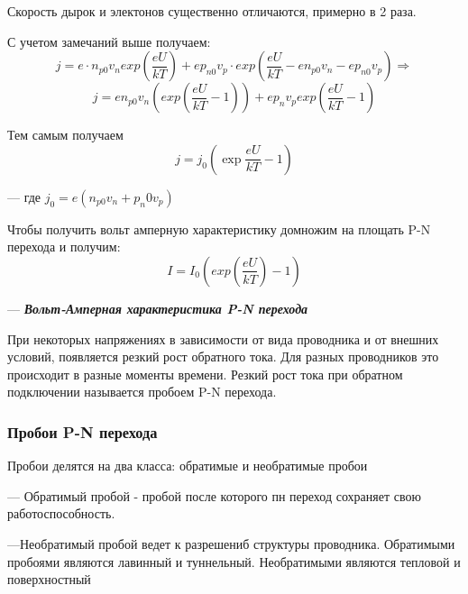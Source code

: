 \documentclass[../main.tex]{subfiles}
\begin{document}
Скорость дырок и электонов существенно отличаются, примерно в 2 раза.

С учетом замечаний выше получаем:
\[j = e \cdot n_{p0} v_n exp(\frac{eU}{kT}) + ep_{n0} v_p \cdot exp(\frac{eU}{kT} - en_{p0} v_n - ep_{n0} v_p)  \Rightarrow \]
\[ j = e n_{p0} v_n(exp(\frac{eU}{kT} - 1)) + e p_n v_p exp(\frac{eU}{kT} - 1)\]

Тем самым получаем
\[ j = j_0(\exp{\frac{eU}{kT}} - 1)\]
\begin{center}
 --- где $j_0 = e (n_{p0} v_n + p_n0 v_p)$
\end{center}
Чтобы получить вольт амперную характеристику домножим на площать P-N перехода и получим:
\[I = I_0(exp(\frac{eU}{kT}) - 1)\]
\begin{center}
    --- \textbf{\textit{Вольт-Амперная характеристика P-N перехода}}
\end{center}

 При некоторых напряжениях в зависимости от вида проводника и от внешних условий, появляется резкий рост обратного тока. Для разных 
проводников это происходит в разные моменты времени. Резкий рост тока при обратном подключении называется пробоем P-N перехода.

\subsubsection{Пробои P-N перехода}

Пробои делятся на два класса: обратимые и необратимые пробои

--- Обратимый пробой - пробой после которого пн переход сохраняет свою работоспособность.

---Необратимый пробой ведет к разрешениб структуры проводника. Обратимыми пробоями являются лавинный и туннельный.
Необратимыми являются тепловой и поверхностный 
\end{document}
